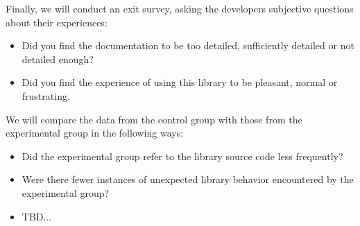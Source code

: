 Finally, we will conduct an exit survey, asking the developers subjective
questions about their experiences:

\begin{itemize}
\item Did you find the documentation to be too detailed, sufficiently detailed
  or not detailed enough?
\item Did you find the experience of using this library to be pleasant, normal
  or frustrating.
\end{itemize}

We will compare the data from the control group with those from the
experimental group in the following ways:

\begin{itemize}
\item Did the experimental group refer to the library source code less
  frequently?
\item Were there fewer instances of unexpected library behavior encountered by
  the experimental group?
\item TBD...
\end{itemize}
